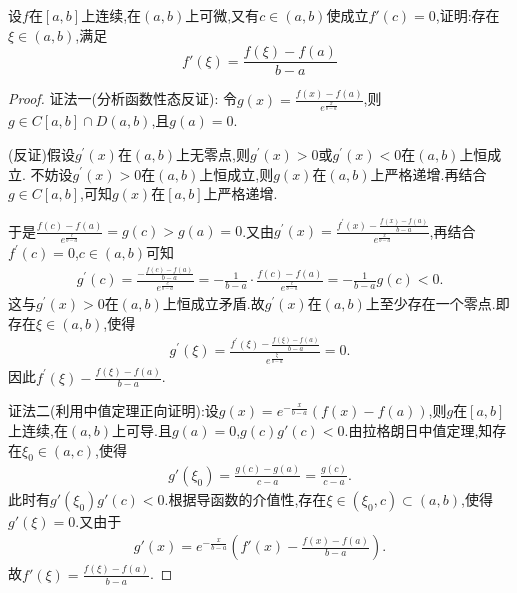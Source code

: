 \documentclass[lang=cn,newtx,10pt,scheme=chinese]{elegantbook}
\begin{document}
\begin{exercise}
    设\(f\)在\([a,b]\)上连续,在\((a,b)\)上可微,又有\(c\in(a,b)\)使成立\(f'(c) = 0\),证明:存在\(\xi\in(a,b)\),满足
    \[
    f'(\xi)=\frac{f(\xi)-f(a)}{b - a}
    \]
\end{exercise}
\begin{proof}
    {\color{blue}证法一(分析函数性态反证):}
    令\(g(x) = \frac{f(x) - f(a)}{e^{\frac{x}{b - a}}}\),则\(g\in C[a,b] \cap D(a,b)\),且\(g(a) = 0\).

    (反证)假设\(g^{\prime}(x)\)在\((a,b)\)上无零点,则\(g^{\prime}(x) > 0\)或\(g^{\prime}(x) < 0\)在\((a,b)\)上恒成立.
    不妨设\(g^{\prime}(x) > 0\)在\((a,b)\)上恒成立,则\(g(x)\)在\((a,b)\)上严格递增.再结合\(g\in C[a,b]\),可知\(g(x)\)在\([a,b]\)上严格递增.
    
    于是\(\frac{f(c) - f(a)}{e^{\frac{c}{b - a}}} = g(c) > g(a) = 0\).又由\(g^{\prime}(x) = \frac{f^{\prime}(x) - \frac{f(x) - f(a)}{b - a}}{e^{\frac{x}{b - a}}}\),再结合\(f^{\prime}(c) = 0\),\(c\in (a,b)\)可知
    \begin{align*}
        g^{\prime}(c) = \frac{-\frac{f(c) - f(a)}{b - a}}{e^{\frac{c}{b - a}}} = -\frac{1}{b - a} \cdot \frac{f(c) - f(a)}{e^{\frac{c}{b - a}}} = -\frac{1}{b - a}g(c) < 0.
    \end{align*}
    这与\(g^{\prime}(x) > 0\)在\((a,b)\)上恒成立矛盾.故\(g^{\prime}(x)\)在\((a,b)\)上至少存在一个零点.即存在\(\xi \in (a,b)\),使得
    \begin{align*}
        g^{\prime}(\xi) = \frac{f^{\prime}(\xi) - \frac{f(\xi) - f(a)}{b - a}}{e^{\frac{\xi}{b - a}}} = 0.
    \end{align*}
    因此\(f^{\prime}(\xi) - \frac{f(\xi) - f(a)}{b - a}\). 

    {\color{blue}证法二(利用中值定理正向证明):}设\(g(x)=e^{-\frac{x}{b - a}}(f(x)-f(a))\),则\(g\)在\([a,b]\)上连续,在\((a,b)\)上可导.且\(g(a) = 0\),\(g(c)g'(c)<0\).由拉格朗日中值定理,知存在\(\xi_0\in(a,c)\),使得
    \begin{align*}
        g'(\xi_0)=\frac{g(c)-g(a)}{c - a}=\frac{g(c)}{c - a}.
    \end{align*}
    此时有\(g'(\xi_0)g'(c)<0\).根据导函数的介值性,存在\(\xi\in(\xi_0,c)\subset(a,b)\),使得\(g'(\xi)=0\).又由于
    \begin{align*}
        g'(x)=e^{-\frac{x}{b - a}}\left(f'(x)-\frac{f(x)-f(a)}{b - a}\right).
    \end{align*}
故\(f'(\xi)=\frac{f(\xi)-f(a)}{b - a}\).
\end{proof}
\end{document}
